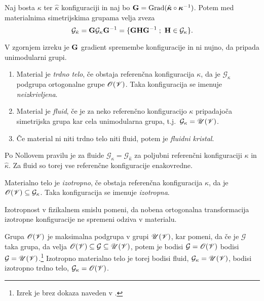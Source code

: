 \begin{izrek}
	Naj bosta $\kappa$ ter $\hat{\kappa}$ konfiguraciji in naj bo
	$\mathbf G=\mathrm{Grad}(\hat{\boldsymbol \kappa}\circ\boldsymbol \kappa^{-1})$. Potem
	med materialnima simetrijskima grupama velja zveza
	\[
		\mathcal{G}_{\hat{\kappa}}=\ten{G}\mathcal{G}_{\kappa}\ten{G}^{-1}
		=\{\ten{G}\ten{H}\ten{G}^{-1}\;;\ \ten{H}\in\mathcal{G}_{\kappa}\}.
	\]
\end{izrek}

V zgornjem izreku je $\mathbf G$ gradient spremembe konfiguracije in ni nujno,
da pripada unimodularni grupi.

\begin{definicija}
	\begin{enumerate}
		\item Material je \emph{trdno telo}, če obstaja referenčna konfiguracija $\kappa$, da je
		$\mathcal{G}_{\kappa}$ podgrupa ortogonalne grupe $\mathscr{O}(\mathscr V)$.
		Taka konfiguracija se imenuje \emph{neizkrivljena}.
		\item Material je \emph{fluid}, če je za neko referenčno konfiguracijo $\kappa$
		pripadajoča simetrijska grupa kar cela unimodularna grupa,
		t.j.~$\mathcal{G}_{\kappa}=\mathscr{U}(\mathscr V)$.
		\item Če material ni niti trdno telo niti fluid, potem je \emph{fluidni kristal}.
	\end{enumerate}
\end{definicija}

Po Nollovem pravilu je za fluide $\mathcal{G}_{\kappa}=\mathcal{G}_{\hat{\kappa}}$
za poljubni referenčni konfiguraciji $\kappa$ in $\hat{\kappa}$. Za fluid so torej
vse referenčne konfiguracije enakovredne.

\begin{definicija}
	Materialno telo je \emph{izotropno}, če obstaja referenčna konfiguracija $\kappa$,
	da je $\mathscr{O}(\mathscr V)\subseteq\mathcal{G}_{\kappa}$. Taka konfiguracija
	se imenuje \emph{izotropna}.
\end{definicija}

Izotropnost v fizikalnem smislu pomeni, da nobena ortogonalna transformacija izotropne
konfiguracije ne spremeni odziva v materialu.

Grupa $\mathscr{O}(\mathscr V)$ je maksimalna podgrupa v grupi $\mathscr{U}(\mathscr V)$, kar pomeni,
da če je $\mathcal{G}$ taka grupa, da velja $\mathscr{O}(\mathscr V)\subseteq\mathcal{G}\subseteq\mathscr{U}(\mathscr V)$,
potem je bodisi $\mathcal{G}=\mathscr{O}(\mathscr V)$ bodisi $\mathcal{G}=\mathscr{U}(\mathscr V)$.\footnote{
Izrek je brez dokaza naveden v \cite[str.~88]{liu}.}
Izotropno materialno telo je torej bodisi fluid, $\mathcal{G}_{\kappa}=\mathscr{U}(\mathscr V)$,
bodisi izotropno trdno telo, $\mathcal{G}_{\kappa}=\mathscr{O}(\mathscr V)$.

